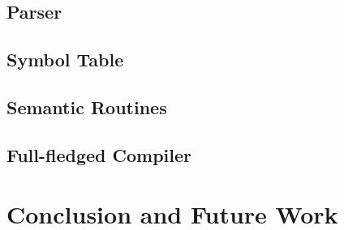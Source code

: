 \documentclass[11pt, oneside]{article}   	%
\begin{document}
	
\subsection{Parser}
\subsection{Symbol Table}
\subsection{Semantic Routines}
\subsection{Full-fledged Compiler}

\section{Conclusion and Future Work}

\end{document}
